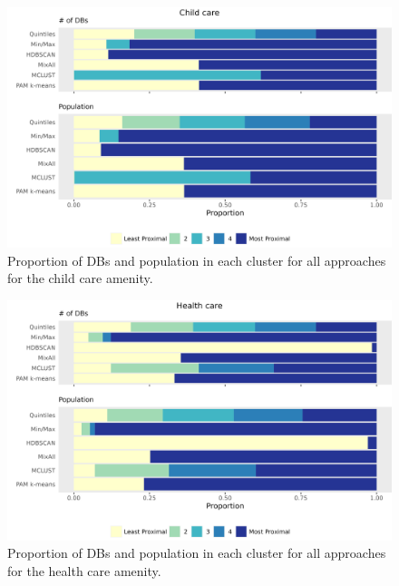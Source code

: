 \documentclass[11pt, a4paper]{article}
\begin{document}
\begin{figure}[H]
\centering
\includegraphics[width=\textwidth]{./barplot_comparison/Child care_barplot.png}
\caption[Child care profile barplot]{Proportion of DBs and population in each cluster for all approaches for the child care amenity.}\label{childcarebarplot}
\end{figure}









\begin{figure}[H]
\centering
\includegraphics[width=\textwidth]{./barplot_comparison/Health care_barplot.png}
\caption[Health care profile barplot]{Proportion of DBs and population in each cluster for all approaches for the health care amenity.}\label{healthcarebarplot}
\end{figure}
\end{document}
